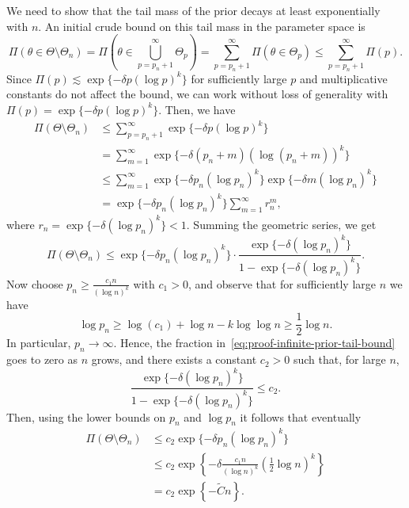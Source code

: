 \noindent We need to show that the tail mass of the prior decays at least exponentially with \(n\). An initial crude bound on this tail mass in the parameter space is
\[
  \Pi(\theta \in \Theta \setminus \Theta_n) = \Pi\left(\theta \in \bigcup_{p=p_n + 1}^\infty \Theta_p\right)  = \sum_{p=p_n+1}^\infty \Pi(\theta \in \Theta_p) \leq \sum_{p=p_n+1}^{\infty} \Pi(p).
\]
Since \(\Pi(p)\lesssim \exp\{-\delta p(\log p)^k\}\) for sufficiently large \(p\) and multiplicative constants do not affect the bound, we can work without loss of generality with \(\Pi(p)=\exp\{-\delta p(\log p)^k\}\). Then, we have
\begin{align*}
  \Pi(\Theta \setminus \Theta_n) & \leq \sum_{p=p_n+1}^\infty \exp\{-\delta p(\log p)^k\}                                \\
                                 & = \sum_{m=1}^\infty \exp\{-\delta (p_n+m)(\log (p_n+m))^k\}                           \\
                                 & \leq \sum_{m=1}^\infty \exp\{-\delta p_n (\log p_n)^k\}\exp\{-\delta m (\log p_n)^k\} \\
                                 & = \exp\{-\delta p_n (\log p_n)^k\} \sum_{m=1}^\infty r_n^m,
\end{align*}
where \(r_n=\exp\{-\delta (\log p_n)^k\}<1\). Summing the geometric series, we get
\begin{equation}\label{eq:proof-infinite-prior-tail-bound}
  \Pi(\Theta \setminus \Theta_n) \leq \exp\{-\delta p_n (\log p_n)^k\} \cdot \frac{\exp\{-\delta (\log p_n)^k\}}{1-\exp\{-\delta (\log p_n)^k\}}.
\end{equation}
Now choose \(p_n \geq \frac{c_1n}{(\log n)^k}\) with \(c_1>0\), and observe that for sufficiently large \(n\) we have
\[
  \log p_n \geq \log(c_1) + \log n - k\log \log n \geq \frac{1}{2}\log n.
\]
In particular, \(p_n\to\infty\). Hence, the fraction in~\eqref{eq:proof-infinite-prior-tail-bound} goes to zero as \(n\) grows, and there exists a constant \(c_2>0\) such that, for large \(n\),
\[
  \frac{\exp\{-\delta (\log p_n)^k\}}{1-\exp\{-\delta (\log p_n)^k\}}\leq c_2.
\]
Then, using the lower bounds on \(p_n\) and \(\log p_n\) it follows that eventually
\begin{align*}
  \Pi(\Theta \setminus \Theta_n) & \leq c_2 \exp\{-\delta p_n (\log p_n)^k\}                                                    \\
                                 & \leq c_2 \exp\left\{-\delta \frac{c_1 n}{(\log n)^k}\left(\frac{1}{2}\log n\right)^k\right\} \\
                                 & = c_2 \exp\left\{-\tilde{C}n\right\}.
\end{align*}
